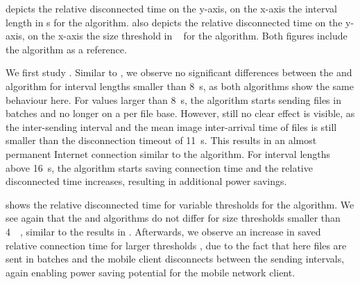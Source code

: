  depicts the relative disconnected time \relativeDisconnectedTime on the y-axis, on the x-axis the interval length \thresholdInterval in \si{\second} for the \algointerval algorithm. 
 also depicts the relative disconnected time \relativeDisconnectedTime on the y-axis, on the x-axis the size threshold \thresholdSize in \si{\mega\byte} for the \algosize algorithm. 
Both figures include the \algoimmediate algorithm as a reference.

We first study .
Similar to , we observe no significant differences between the \algointerval and \algoimmediate algorithm for interval lengths \thresholdInterval smaller than \SI{8}{\second}, as both algorithms show the same behaviour here.
For values larger than \SI{8}{\second}, the \algointerval algorithm starts sending files in batches and no longer on a per file base.
However, still no clear effect is visible, as the inter-sending interval and the mean image inter-arrival time of files is still smaller than the disconnection timeout of \SI{11}{\second}.
This results in an almost permanent Internet connection similar to the \algoimmediate algorithm.
For interval lengths \thresholdInterval above \SI{16}{\second}, the \algointerval algorithm starts saving connection time and the relative disconnected time \relativeDisconnectedTime increases, resulting in additional power savings.

 shows the relative disconnected time \relativeDisconnectedTime for variable thresholds for the \algosize algorithm.
We see again that the \algosize and \algoimmediate algorithms do not differ for size thresholds \thresholdSize smaller than \SI{4}{\mega\byte}, similar to the results in .
Afterwards, we observe an increase in saved relative connection time \relativeDisconnectedTime for larger thresholds \thresholdSize, due to the fact that here files are sent in batches and the mobile client disconnects between the sending intervals, again enabling power saving potential for the mobile network client.

